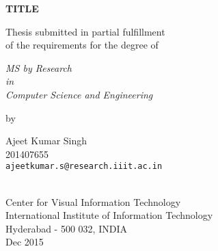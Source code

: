 \thispagestyle{empty}
\begin{center}
\vspace*{1.5cm}
{\Large \bf TITLE}

\vspace*{3.75cm}
{\large Thesis submitted in partial fulfillment\\}
{\large  of the requirements for the degree of \\}

\vspace*{1cm}
{\it {\large MS by Research} \\
{\large in\\}
{\large Computer Science and Engineering \\}}

\vspace*{1cm}
{\large by}

\vspace*{5mm}
{\large Ajeet Kumar Singh\\}
{\large 201407655\\
{\small \tt ajeetkumar.s@research.iiit.ac.in}}


\vspace*{4.0cm}
{\\}
{\large Center for Visual Information Technology\\}
{\large International Institute of Information Technology\\}
{\large Hyderabad - 500 032, INDIA\\}
{\large Dec 2015\\}
\end{center}